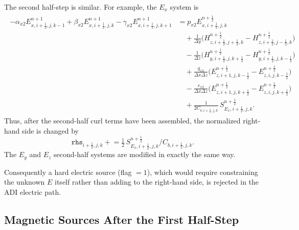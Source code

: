 \documentclass{article}
\numberwithin{equation}{section}
\numberwithin{figure}{section}
\begin{document}
The second half-step is similar. For example, the $E_x$ system is
\begin{align}
    \begin{split}
        -\alpha_{x2}E_{x,i+\tfrac12,j,k-1}^{n+1}
        + \beta_{x2}E_{x,i+\tfrac12,j,k}^{n+1}
        - \gamma_{x2}E_{x,i+\tfrac12,j,k+1}^{n+1}
         & = p_{x2}E_{x,i+\tfrac12,j,k}^{n+\frac12}                                                                               \\
         & \quad +\frac{1}{\Delta y}\Big(H_{z,i+\tfrac12,j+\tfrac12,k}^{n+\frac12}-H_{z,i+\tfrac12,j-\tfrac12,k}^{n+\frac12}\Big) \\
         & \quad -\frac{1}{\Delta z}\Big(H_{y,i+\tfrac12,j,k+\tfrac12}^{n+\frac12}-H_{y,i+\tfrac12,j,k-\tfrac12}^{n+\frac12}\Big) \\
         & \quad +\frac{q_{x2}}{\Delta x\Delta z}\Big(E_{z,i+1,j,k-\tfrac12}^{n+\frac12}-E_{z,i,j,k-\tfrac12}^{n+\frac12}\Big)    \\
         & \quad -\frac{r_{x2}}{\Delta x\Delta z}\Big(E_{z,i+1,j,k+\tfrac12}^{n+\frac12}-E_{z,i,j,k+\tfrac12}^{n+\frac12}\Big)    \\
         & \quad +\frac{1}{2C_{b,i+\tfrac12,j,k}}\,S_{E_x,i+\tfrac12,j,k}^{n+\frac12}.
    \end{split}
    \label{eq:second-e-ex-adi-tridiagonal-excitation}
\end{align}
Thus, after the second-half curl terms have been assembled, the normalized right-hand side is changed by
\begin{equation}
    \texttt{rhs}_{i+\tfrac12,j,k} \mathrel{+}= \tfrac12\,S_{E_x,i+\tfrac12,j,k}^{n+\frac12}/C_{b,i+\tfrac12,j,k}.
\end{equation}
The $E_y$ and $E_z$ second-half systems are modified in exactly the same way.

Consequently a hard electric source (flag $=1$), which would require constraining the unknown $E$ itself rather than adding to the right-hand side, is rejected in the ADI electric path.

\subsection{Magnetic Sources After the First Half-Step}
\end{document}
